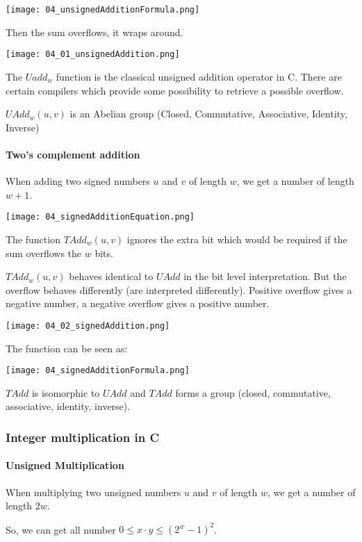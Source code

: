 \texttt{[image: 04\_unsignedAdditionFormula.png]}

Then the sum overflows, it wraps around.

\texttt{[image: 04\_01\_unsignedAddition.png]}

The $Uadd_w$ function is the classical unsigned addition operator in C. There are certain compilers which provide some possibility to retrieve a possible overflow.

$UAdd_w(u,v)$ is an Abelian group (Closed, Commutative, Associative, Identity, Inverse)

\paragraph{Two's complement addition}
When adding two signed numbers $u$ and $v$ of length $w$, we get a number of length $w + 1$.

\texttt{[image: 04\_signedAdditionEquation.png]}

The function $TAdd_w(u,v)$ ignores the extra bit which would be required if the sum overflows the $w$ bits.

$TAdd_w(u,v)$ behaves identical to $UAdd$ in the bit level interpretation. But the overflow behaves differently (are interpreted differently). Positive overflow gives a negative number, a negative overflow gives a positive number.

\texttt{[image: 04\_02\_signedAddition.png]}

The function can be seen as:

\texttt{[image: 04\_signedAdditionFormula.png]}

$TAdd$ is isomorphic to $UAdd$ and $TAdd$ forms a group (closed, commutative, associative, identity, inverse).

\subsubsection{Integer multiplication in C}

\paragraph{Unsigned Multiplication}
When multiplying two unsigned numbers $u$ and $v$ of length $w$, we get a number of length $2w$.

So, we can get all number $0 \le x \cdot y \le (2^w -1)^2$.

